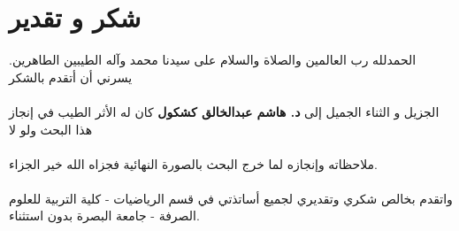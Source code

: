 \chapter*{شكر و تقدير}

الحمدلله رب العالمين والصلاة والسلام على سيدنا محمد وآله الطيبين الطاهرين. يسرني أن أتقدم بالشكر\\ \\ الجزيل و الثناء الجميل إلى \textbf{د. هاشم عبدالخالق كشكول} كان له الأثر الطيب في إنجاز هذا البحث ولو لا\\ \\ ملاحظاته وإنجازه لما خرج البحث بالصورة النهائية فجزاه الله خير الجزاء.\\
\\
واتقدم بخالص شكري وتقديري لجميع أساتذتي في قسم الرياضيات - كلية التربية للعلوم الصرفة - جامعة البصرة بدون استثناء.
